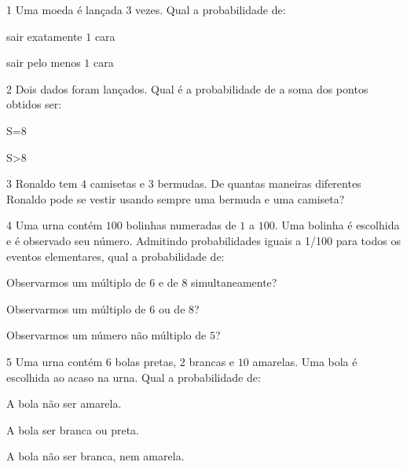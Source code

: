 {

\num{1}  Uma moeda é lançada $3$ vezes. Qual a probabilidade de:

\begin{escolha}
\item sair exatamente $1$ cara 
\item sair pelo menos $1$ cara 
\end{escolha}

\num{2}  Dois dados foram lançados. Qual é a probabilidade de a soma dos
pontos obtidos ser:

\begin{escolha}
\item S=8 
\item S\textgreater8 
\end{escolha}

\num{3}  Ronaldo tem $4$ camisetas e $3$ bermudas. De quantas maneiras diferentes
Ronaldo pode se vestir usando sempre uma bermuda e uma camiseta?

\begin{escolha}
\end{escolha}

\num{4}  Uma urna contém $100$ bolinhas numeradas de $1$ a $100$. Uma bolinha é
escolhida e é observado seu número. Admitindo probabilidades iguais a
1/100 para todos os eventos elementares, qual a probabilidade de:

\begin{escolha}
\item Observarmos um múltiplo de $6$ e de $8$ simultaneamente? 
\item Observarmos um múltiplo de $6$ ou de $8$? 
\item Observarmos um número não múltiplo de $5$? 
\end{escolha}

\num{5}  Uma urna contém $6$ bolas pretas, $2$ brancas e $10$ amarelas. Uma bola é
escolhida ao acaso na urna. Qual a probabilidade de:

\begin{escolha}
\item A bola não ser amarela. 
\item A bola ser branca ou preta. 
\item A bola não ser branca, nem amarela. 
\end{escolha}

}
